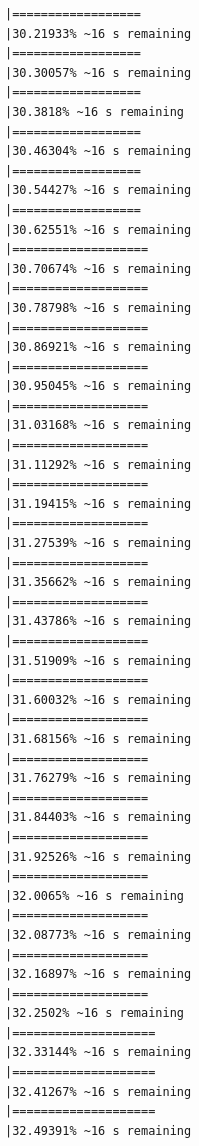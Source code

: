 \documentclass{article}\usepackage[]{graphicx}\usepackage[]{xcolor}
\makeatletter
\newenvironment{kframe}{%
 \def\at@end@of@kframe{}%
 \ifinner\ifhmode%
  \def\at@end@of@kframe{\end{minipage}}%
  \begin{minipage}{\columnwidth}%
 \fi\fi%
 \def\FrameCommand##1{\hskip\@totalleftmargin \hskip-\fboxsep
 \colorbox{shadecolor}{##1}\hskip-\fboxsep
     \hskip-\linewidth \hskip-\@totalleftmargin \hskip\columnwidth}%
 \MakeFramed {\advance\hsize-\width
   \@totalleftmargin\z@ \linewidth\hsize
   \@setminipage}}%
 {\par\unskip\endMakeFramed%
 \at@end@of@kframe}
\newenvironment{knitrout}{}{} %
\makeatother
\begin{document}
\begin{knitrout}
\begin{kframe}
\begin{verbatim}
|==================                                            |30.21933% ~16 s remaining 
|==================                                            |30.30057% ~16 s remaining 
|==================                                            |30.3818% ~16 s remaining  
|==================                                            |30.46304% ~16 s remaining 
|==================                                            |30.54427% ~16 s remaining 
|==================                                            |30.62551% ~16 s remaining 
|===================                                           |30.70674% ~16 s remaining 
|===================                                           |30.78798% ~16 s remaining 
|===================                                           |30.86921% ~16 s remaining 
|===================                                           |30.95045% ~16 s remaining 
|===================                                           |31.03168% ~16 s remaining 
|===================                                           |31.11292% ~16 s remaining 
|===================                                           |31.19415% ~16 s remaining 
|===================                                           |31.27539% ~16 s remaining 
|===================                                           |31.35662% ~16 s remaining 
|===================                                           |31.43786% ~16 s remaining 
|===================                                           |31.51909% ~16 s remaining 
|===================                                           |31.60032% ~16 s remaining 
|===================                                           |31.68156% ~16 s remaining 
|===================                                           |31.76279% ~16 s remaining 
|===================                                           |31.84403% ~16 s remaining 
|===================                                           |31.92526% ~16 s remaining 
|===================                                           |32.0065% ~16 s remaining  
|===================                                           |32.08773% ~16 s remaining 
|===================                                           |32.16897% ~16 s remaining 
|===================                                           |32.2502% ~16 s remaining  
|====================                                          |32.33144% ~16 s remaining 
|====================                                          |32.41267% ~16 s remaining 
|====================                                          |32.49391% ~16 s remaining 

\end{verbatim}
\end{kframe}
\end{knitrout}
\end{document}
